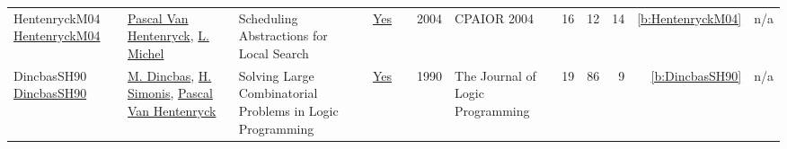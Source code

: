 {\begin{longtable}{>{\raggedright\arraybackslash}p{3cm}>{\raggedright\arraybackslash}p{6cm}>{\raggedright\arraybackslash}p{6.5cm}rrrp{2.5cm}rrrrr}
HentenryckM04 \href{https://doi.org/10.1007/978-3-540-24664-0_22}{HentenryckM04} & \hyperref[auth:a149]{Pascal Van Hentenryck}, \hyperref[auth:a32]{L. Michel} & Scheduling Abstractions for Local Search & \href{../works/HentenryckM04.pdf}{Yes} & \cite{HentenryckM04} & 2004 & CPAIOR 2004 & 16 & 12 & 14 & \ref{b:HentenryckM04} & n/a\\
DincbasSH90 \href{https://doi.org/10.1016/0743-1066(90)90052-7}{DincbasSH90} & \hyperref[auth:a723]{M. Dincbas}, \hyperref[auth:a17]{H. Simonis}, \hyperref[auth:a149]{Pascal Van Hentenryck} & Solving Large Combinatorial Problems in Logic Programming & \href{../works/DincbasSH90.pdf}{Yes} & \cite{DincbasSH90} & 1990 & The Journal of Logic Programming & 19 & 86 & 9 & \ref{b:DincbasSH90} & n/a\\
\end{longtable}
}

\clearpage
